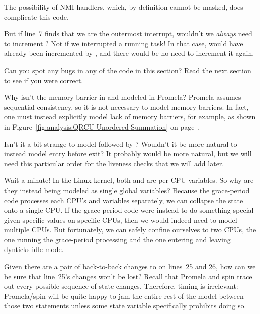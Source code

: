 \begin{enumerate}
	The possibility of NMI handlers, which, by definition cannot
	be masked, does complicate this code.

\QuickQ{}
	But if line~7 finds that we are the outermost interrupt,
	wouldn't we \emph{always} need to increment
	?
\QuickA{}
	Not if we interrupted a running task!
	In that case,  would
	have already been incremented by ,
	and there would be no need to increment it again.

\QuickQ{}
	Can you spot any bugs in any of the code in this section?
\QuickA{}
	Read the next section to see if you were correct.

\QuickQ{}
	Why isn't the memory barrier in 
	and  modeled in Promela?
\QuickA{}
	Promela assumes sequential consistency, so
	it is not necessary to model memory barriers.
	In fact, one must instead explicitly model lack of memory barriers,
	for example, as shown in
	Figure~\ref{fig:analysis:QRCU Unordered Summation} on
	page~\pageref{fig:analysis:QRCU Unordered Summation}.

\QuickQ{}
	Isn't it a bit strange to model 
	followed by ?
	Wouldn't it be more natural to instead model entry before exit?
\QuickA{}
	It probably would be more natural, but we will need
	this particular order for the liveness checks that we will add later.

\QuickQ{}
	Wait a minute!
	In the Linux kernel, both  and
	 are per-CPU variables.
	So why are they instead being modeled as single global variables?
\QuickA{}
	Because the grace-period code processes each
	CPU's  and
	 variables separately,
	we can collapse the state onto a single CPU.
	If the grace-period code were instead to do something special
	given specific values on specific CPUs, then we would indeed need
	to model multiple CPUs.
	But fortunately, we can safely confine ourselves to two CPUs, the
	one running the grace-period processing and the one entering and
	leaving dynticks-idle mode.

\QuickQ{}
	Given there are a pair of back-to-back changes to
	 on lines~25 and 26,
	how can we be sure that line~25's changes won't be lost?
\QuickA{}
	Recall that Promela and spin trace out
	every possible sequence of state changes.
	Therefore, timing is irrelevant: Promela/spin will be quite
	happy to jam the entire rest of the model between those two
	statements unless some state variable specifically prohibits
	doing so.


\end{enumerate}
